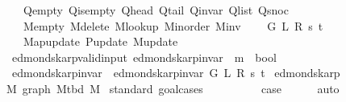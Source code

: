 \begin{isabellebody}
\ \ \ \ Q{\isacharunderscore}{\kern0pt}empty\ Q{\isacharunderscore}{\kern0pt}is{\isacharunderscore}{\kern0pt}empty\ Q{\isacharunderscore}{\kern0pt}head\ Q{\isacharunderscore}{\kern0pt}tail\ Q{\isacharunderscore}{\kern0pt}invar\ Q{\isacharunderscore}{\kern0pt}list\ Q{\isacharunderscore}{\kern0pt}snoc\isanewline
\ \ \ \ M{\isacharunderscore}{\kern0pt}empty\ M{\isacharunderscore}{\kern0pt}delete\ M{\isacharunderscore}{\kern0pt}lookup\ M{\isacharunderscore}{\kern0pt}inorder\ M{\isacharunderscore}{\kern0pt}inv\isanewline
\ \ \ \ G\ L\ R\ s\ t\isanewline
\ \ \ \ Map{\isacharunderscore}{\kern0pt}update\ P{\isacharunderscore}{\kern0pt}update\ M{\isacharunderscore}{\kern0pt}update{\isachardoublequoteclose}\isanewline
\isanewline
{}\isamarkupfalse%
\ {\isacharparenleft}{\kern0pt}\ edmonds{\isacharunderscore}{\kern0pt}karp{\isacharunderscore}{\kern0pt}valid{\isacharunderscore}{\kern0pt}input{\isacharparenright}{\kern0pt}\ edmonds{\isacharunderscore}{\kern0pt}karp{\isacharunderscore}{\kern0pt}invar{\isacharprime}{\kern0pt}{\isacharprime}{\kern0pt}\ {\isacharcolon}{\kern0pt}{\isacharcolon}{\kern0pt}\ {\isachardoublequoteopen}{\isacharprime}{\kern0pt}m\ {\isasymRightarrow}\ bool{\isachardoublequoteclose}\ \isanewline
\ \ {\isachardoublequoteopen}edmonds{\isacharunderscore}{\kern0pt}karp{\isacharunderscore}{\kern0pt}invar{\isacharprime}{\kern0pt}{\isacharprime}{\kern0pt}\ {\isasymequiv}\ edmonds{\isacharunderscore}{\kern0pt}karp{\isacharunderscore}{\kern0pt}invar{\isacharprime}{\kern0pt}\ G\ L\ R\ s\ t{\isachardoublequoteclose}\isanewline
\isanewline
{}\isamarkupfalse%
\ edmonds{\isacharunderscore}{\kern0pt}karp\isanewline
{}\isanewline
{}\isamarkupfalse%
\ M{\isacharcolon}{\kern0pt}\ graph\ {\isachardoublequoteopen}M{\isacharunderscore}{\kern0pt}tbd\ M{\isachardoublequoteclose}%
\endisataginvisible
{\isafoldinvisible}%
%
\isadeliminvisible
\isanewline
%
\endisadeliminvisible
%
\isadelimproof
%
\endisadelimproof
%
\isatagproof
{}\isamarkupfalse%
\ {\isacharparenleft}{\kern0pt}standard{\isacharcomma}{\kern0pt}\ goal{\isacharunderscore}{\kern0pt}cases{\isacharparenright}{\kern0pt}\isanewline
\ \ \isamarkupfalse%
\ {}\isanewline
\ \ \isamarkupfalse%
\ \isamarkupfalse%
\ {\isacharquery}{\kern0pt}case\isanewline
\ \ \ \ \isamarkupfalse%
\ auto\isanewline
{}\isamarkupfalse%
%
\endisatagproof
{\isafoldproof}%
%
\isadelimproof
\isanewline
%
\endisadelimproof
%
\isadeliminvisible

\end{isabellebody}
